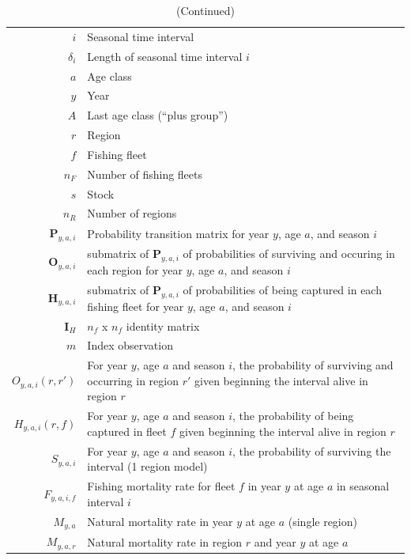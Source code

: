 \documentclass[
]{article}
\begin{document}
\setcounter{table}{0}
\renewcommand\thetable{A\arabic{table}}
\begin{longtable}[c]{r p{}}
\caption{Definition of terms.\label{symbols}}%
\\ \hline \hline \endfirsthead 
\caption[]{(Continued)} %
\\ \hline \hline \endhead
 \hline \hline \endfoot
$i$ & Seasonal time interval\\
$\delta_i$ & Length of seasonal time interval $i$\\
$a$ & Age class\\
$y$ & Year\\
$A$ & Last age class (``plus group'')\\
$r$ & Region\\
$f$ & Fishing fleet\\
$n_F$ & Number of fishing fleets\\
$s$ & Stock\\
$n_R$ & Number of regions\\
$\mathbf{P}_{y,a,i}$ & Probability transition matrix for year $y$, age $a$, and season $i$\\
$\mathbf{O}_{y,a,i}$ & submatrix of $\mathbf{P}_{y,a,i}$ of probabilities of surviving and occuring in each region for year $y$, age $a$, and season $i$\\
$\mathbf{H}_{y,a,i}$ & submatrix of $\mathbf{P}_{y,a,i}$ of probabilities of being captured in each fishing fleet for year $y$, age $a$, and season $i$\\
$\mathbf{I}_{H}$ & $n_f$ x $n_f$ identity matrix \\
$m$ & Index observation\\
$O_{y,a,i}(r,r')$ & For year $y$, age $a$ and season $i$, the probability of surviving and occurring in region $r'$ given beginning the interval alive in region $r$\\
$H_{y,a,i}(r,f)$ & For year $y$, age $a$ and season $i$, the probability of being captured in fleet $f$ given beginning the interval alive in region $r$\\
$S_{y,a,i}$ & For year $y$, age $a$ and season $i$, the probability of surviving the interval (1 region model)\\
$F_{y,a,i,f}$ & Fishing mortality rate for fleet $f$ in year $y$ at age $a$ in seasonal interval $i$\\
$M_{y,a}$ &  Natural mortality rate in year $y$ at age $a$ (single region)\\
$M_{y,a,r}$ & Natural mortality rate in region $r$ and year $y$ at age $a$\\

\end{longtable}
\end{document}
